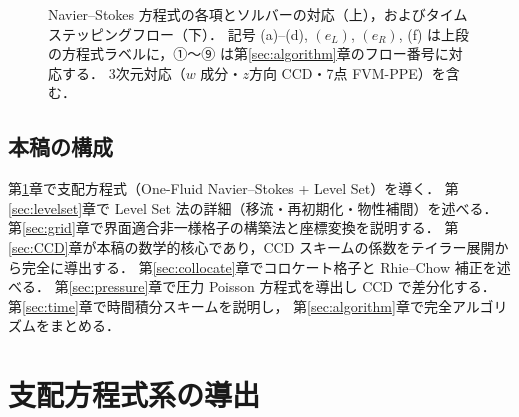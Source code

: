 \documentclass[12pt, a4paper, titlepage]{article}
\newcommand{\jp}[1]{{\normalfont\jpfont #1}}
\begin{document}
\begin{figure}[p]
{%
}%
\caption{\jp{Navier--Stokes 方程式の各項とソルバーの対応（上），およびタイムステッピングフロー（下）．
記号 (a)--(d), $(e_L)$, $(e_R)$, (f) は上段の方程式ラベルに，①〜⑨ は第\ref{sec:algorithm}章のフロー番号に対応する．
3次元対応（$w$ 成分・$z$}\jp{方向 CCD・7点 FVM-PPE）を含む．}}
\label{fig:overview}
\end{figure}

\subsection{\jp{本稿の構成}}

\jp{第\ref{sec:governing}章で支配方程式（One-Fluid Navier--Stokes + Level Set）を導く．
第\ref{sec:levelset}章で Level Set 法の詳細（移流・再初期化・物性補間）を述べる．
第\ref{sec:grid}章で界面適合非一様格子の構築法と座標変換を説明する．
第\ref{sec:CCD}章が本稿の数学的核心であり，CCD スキームの係数をテイラー展開から完全に導出する．
第\ref{sec:collocate}章でコロケート格子と Rhie--Chow 補正を述べる．
第\ref{sec:pressure}章で圧力 Poisson 方程式を導出し CCD で差分化する．
第\ref{sec:time}章で時間積分スキームを説明し，
第\ref{sec:algorithm}章で完全アルゴリズムをまとめる．}


\section{\jp{支配方程式系の導出}}
\label{sec:governing}
\end{document}
